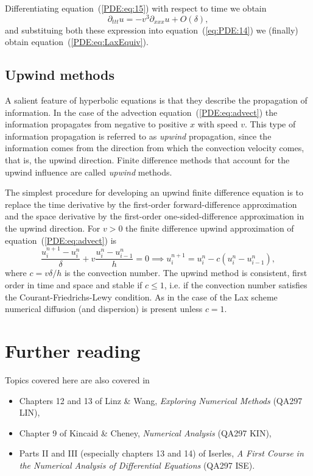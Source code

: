 %
Differentiating equation~(\ref{PDE:eq:15}) with respect to time we
obtain
%
\begin{equation*}
  \partial_{t t t} u = -v^3 \partial_{x x x} u + O(\delta) ,
\end{equation*}
%
and substituing both these expression into equation~(\ref{eq:PDE:14})
we (finally) obtain equation~(\ref{PDE:eq:LaxEquiv}).

\subsection{Upwind methods}

A salient feature of hyperbolic equations is that they describe the
propagation of information.  In the case of the advection
equation~(\ref{PDE:eq:advect}) the information propagates from
negative to positive $x$ with speed $v$.  This type of information
propagation is referred to as \textit{upwind} propagation, since the
information comes from the direction from which the convection
velocity comes, that is, the upwind direction.  Finite difference
methods that account for the upwind influence are called
\textit{upwind} methods.

The simplest procedure for developing an upwind finite difference
equation is to replace the time derivative by the first-order
forward-difference approximation and the space derivative by the
first-order one-sided-difference approximation in the upwind
direction.  For $v > 0$ the finite difference upwind approximation of
equation~(\ref{PDE:eq:advect}) is
%
\begin{equation}
  \frac{u_{i}^{n+1}-u_{i}^{n}}{\delta} + v
  \frac{u_{i}^{n} - u_{i-1}^{n}}{h} = 0 \implies
  u_{i}^{n+1} = u_{i}^{n} - c ( u_{i}^{n} - u_{i-1}^{n} ) ,
  \label{eq:PDE:Upw}
\end{equation}
%
where $c=v \delta/h$ is the convection number.  The upwind method is
consistent, first order in time and space and stable if $c \le 1$,
i.e. if the convection number satisfies the Courant-Friedrichs-Lewy
condition.  As in the case of the Lax scheme numerical diffusion (and
dispersion) is present unless $c=1$.

\section*{Further reading}

Topics covered here are also covered in
\begin{itemize}
\item Chapters 12 and 13 of Linz \& Wang, \textit{Exploring Numerical
    Methods} (QA297 LIN),
\item Chapter 9 of Kincaid \& Cheney, \textit{Numerical Analysis}
  (QA297 KIN),
\item Parts II and III (especially chapters 13 and 14) of Iserles,
  \textit{A First Course in the Numerical Analysis of Differential
    Equations} (QA297 ISE).
\end{itemize}
